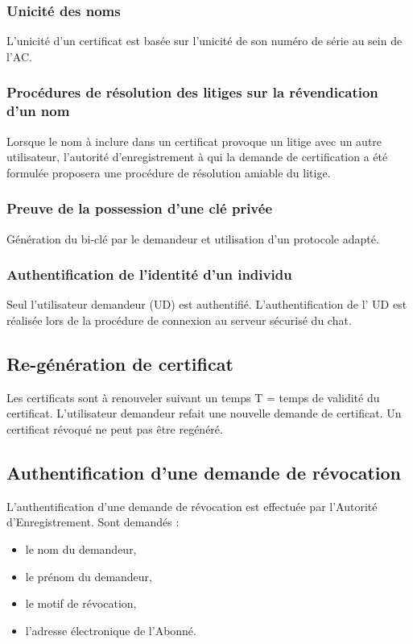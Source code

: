 \documentclass[a4paper,11pt,french]{article}
\begin{document}
\subsubsection{Unicité des noms}
L’unicité d’un certificat est basée sur l’unicité de son numéro de série au sein de l'AC.

\subsubsection{Procédures de résolution des litiges sur la révendication d'un nom}
Lorsque le nom à inclure dans un certificat provoque un litige avec un autre utilisateur, l’autorité d’enregistrement à qui la demande de certification a été formulée proposera une procédure de résolution amiable du litige.

\subsubsection{Preuve de la possession d'une clé privée}
Génération du bi-clé par le demandeur et utilisation d'un protocole adapté.

\subsubsection{Authentification de l'identité d'un individu}
Seul l'utilisateur demandeur (UD) est authentifié. L'authentification de l' UD est réalisée lors de la procédure de connexion au serveur sécurisé du chat.

\subsection{Re-génération de certificat}
Les certificats sont à renouveler suivant un temps T = temps de validité du certificat. L'utilisateur demandeur refait une nouvelle demande de certificat. Un certificat révoqué ne peut pas être regénéré.
\subsection{Authentification d'une demande de révocation}
L'authentification d'une demande de révocation est effectuée par l'Autorité d'Enregistrement.
Sont demandés :
\begin{itemize}
\item le nom du demandeur,
\item le prénom du demandeur,
\item le motif de révocation,
\item l’adresse électronique de l'Abonné.
\end{itemize}
\end{document}
